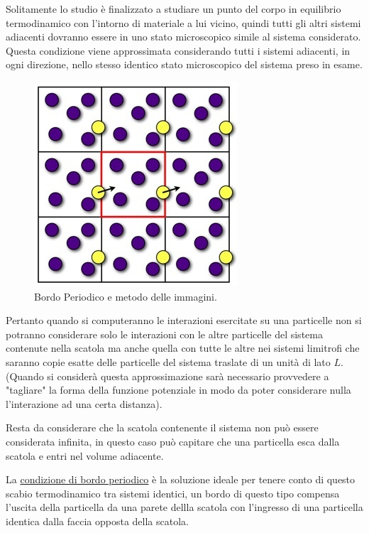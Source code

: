 \documentclass[11pt]{article}
\theoremstyle{plain}
\theoremstyle{remark}
\begin{document}
\begin{itemize}
Solitamente lo studio è finalizzato a studiare un punto del corpo in equilibrio termodinamico con l'intorno di materiale a lui vicino, quindi tutti gli altri sistemi adiacenti dovranno essere in uno stato microscopico simile al sistema considerato.
\newline
Questa condizione viene approssimata considerando tutti i sistemi adiacenti, in ogni direzione, nello stesso identico stato microscopico del sistema preso in esame. 

	\begin{figure}[h!]
		\centering
		\includegraphics[scale=0.5]{Immagini/BordoPeriodo.jpg}
		\caption[Bordo Periodico]{Bordo Periodico e metodo delle immagini.}\label{fig: BordoPeriodo}
	\end{figure}

Pertanto quando si computeranno le interazioni esercitate su una particelle non si potranno considerare solo le interazioni con le altre particelle del sistema contenute nella scatola ma anche quella con tutte le altre nei sistemi limitrofi che saranno copie esatte delle particelle del sistema traslate di un unità di lato $L$.
(Quando si considerà questa approssimazione sarà necessario provvedere a "tagliare" la forma della funzione potenziale in modo da poter considerare nulla l'interazione ad una certa distanza).

Resta da considerare che la scatola contenente il sistema non può essere considerata infinita, in questo caso può capitare che una particella esca dalla scatola e entri nel volume adiacente.

La \underline{condizione di bordo periodico} è la soluzione ideale per tenere conto di questo scabio termodinamico tra sistemi identici, un bordo di questo tipo compensa l'uscita della particella da una parete dellla scatola con l'ingresso di una particella identica dalla faccia opposta della scatola.



\end{itemize}
\end{document}
